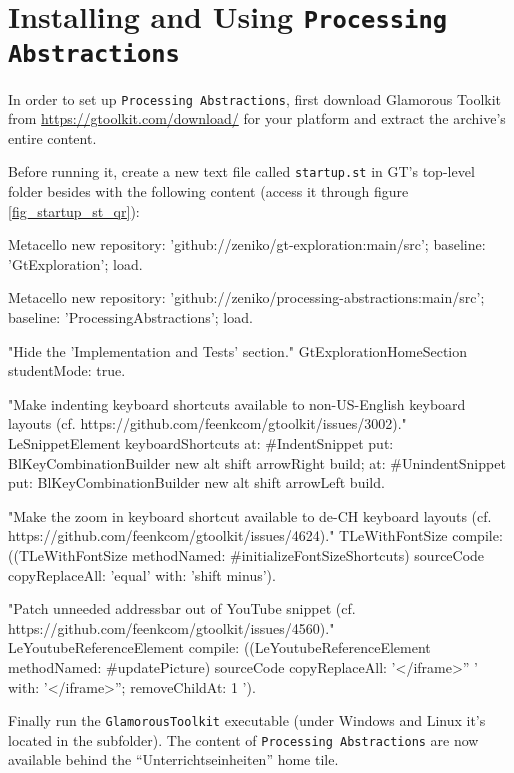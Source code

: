 
\chapter{Installing and Using \texttt{Processing Abstractions}} \label{app_setup}

In order to set up \texttt{Processing Abstractions}, first download Glamorous Toolkit from \url{https://gtoolkit.com/download/} for your platform and extract the archive's entire content.

Before running it, create a new text file called \texttt{startup.st} in GT's top-level folder besides  with the following content (access it through figure \ref{fig_startup_st_qr}):

\begin{code}
Metacello new
	repository: 'github://zeniko/gt-exploration:main/src';
	baseline: 'GtExploration';
	load.

Metacello new
	repository: 'github://zeniko/processing-abstractions:main/src';
	baseline: 'ProcessingAbstractions';
	load.

"Hide the 'Implementation and Tests' section."
GtExplorationHomeSection studentMode: true.

"Make indenting keyboard shortcuts available to non-US-English keyboard layouts
(cf. https://github.com/feenkcom/gtoolkit/issues/3002)."
LeSnippetElement keyboardShortcuts
	at: #IndentSnippet
		put: BlKeyCombinationBuilder new alt shift arrowRight build;
	at: #UnindentSnippet
		put: BlKeyCombinationBuilder new alt shift arrowLeft build.

"Make the zoom in keyboard shortcut available to de-CH keyboard layouts
(cf. https://github.com/feenkcom/gtoolkit/issues/4624)."
TLeWithFontSize compile:
	((TLeWithFontSize methodNamed: #initializeFontSizeShortcuts) sourceCode
		copyReplaceAll: 'equal' with: 'shift minus').

"Patch unneeded addressbar out of YouTube snippet
(cf. https://github.com/feenkcom/gtoolkit/issues/4560)."
LeYoutubeReferenceElement compile:
	((LeYoutubeReferenceElement methodNamed: #updatePicture) sourceCode
		copyReplaceAll: '</iframe>'' ' with: '</iframe>''; removeChildAt: 1 ').
\end{code}

Finally run the \texttt{GlamorousToolkit} executable (under Windows and Linux it's located in the  subfolder). The content of \texttt{Processing Abstractions} are now available behind the ``Unterrichtseinheiten'' home tile.


